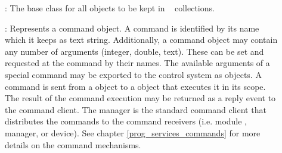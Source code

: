 

\begin{description}

\item[] :  The base class for all objects to be kept in \dabc~ collections.

\item[] : 
Represents a command object. A command 
   is identified by its name which it keeps as text string. Additionally, 
   a command object may contain any number of arguments (integer, double, text). 
   These can be set and requested at the command by their names. 
   The available arguments of a special command may be exported to the control 
   system as  objects. A command is sent from a 
    object to a  object
    that executes it in its scope. 
   The result of the command execution may be returned as a reply event to 
   the command client. The manager is the standard command client 
   that distributes the commands to the command receivers 
   (i.e. module , manager, or device). See chapter \ref{prog_services_commands}
   for more details on the command mechanisms.


\end{description}
